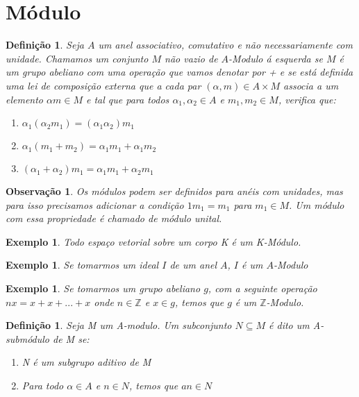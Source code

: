 \documentclass[10pt,a4paper]{article}
\newtheorem{example}[theorem]{Exemplo}
\newtheorem{remark}[theorem]{Observação}
\newtheorem{definition}[theorem]{Definição}
\begin{document}
\section{Módulo}

\begin{definition}
	Seja $A$ um anel associativo, comutativo e não necessariamente com unidade. Chamamos um conjunto $M$ não vazio de $A$-Modulo á esquerda se $M$ é um grupo abeliano com uma operação que vamos denotar por + e se está definida uma lei de composição externa que a cada par $(\alpha, m) \in A\times M$ associa a um elemento $\alpha m \in M$ e tal que para todos $\alpha_1, \alpha_2 \in A$ e $m_1, m_2 \in M$, verifica que: 
	\begin{enumerate}
		\item $\alpha_1(\alpha_2 m_1) = (\alpha_1 \alpha_2)m_1$
		\item $\alpha_1(m_1+m_2) = \alpha_1 m_1 + \alpha_1 m_2$
		\item $(\alpha_1+\alpha_2)m_1=\alpha_1 m_1+\alpha_2 m_1$
	\end{enumerate}
\end{definition}

\begin{remark}
	Os módulos podem ser definidos para anéis com unidades, mas para isso precisamos adicionar a condição $1m_1=m_1$ para $m_1 \in M$. Um módulo com essa propriedade é chamado de módulo unital.
\end{remark}

\begin{example}
	Todo espaço vetorial sobre um corpo K é um K-Módulo.
\end{example}

\begin{example}
	Se tomarmos um ideal $I$ de um anel $A$, $I$ é um $A$-Modulo
\end{example}

\begin{example}
	Se tomarmos um grupo abeliano $g$, com a seguinte operação $nx = x+x+...+x$ onde $n \in \mathbb{Z}$ e $x \in g$, temos que $g$ é um $\mathbb{Z}$-Modulo.
\end{example}

\begin{definition}
	Seja M um A-modulo. Um subconjunto $N \subseteq M$ é dito um A-submódulo de M se:
	\begin{enumerate}
		\item N é um subgrupo aditivo de M
		\item Para todo $\alpha \in A$ e $n \in N$, temos que $an \in N$
	\end{enumerate}
\end{definition}
\end{document}
